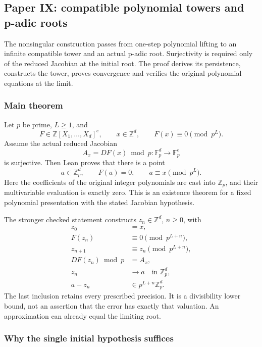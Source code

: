 \hypertarget{cont3:paper-ix-compatible-polynomial-towers-and-p-adic-roots}{%
\subsection{Paper IX: compatible polynomial towers and p-adic
roots}\label{cont3:paper-ix-compatible-polynomial-towers-and-p-adic-roots}}

The nonsingular construction passes from one-step
polynomial lifting to an infinite compatible tower and an actual p-adic
root. Surjectivity is required only of the reduced Jacobian at the
initial root. The proof derives its persistence, constructs the tower,
proves convergence and verifies the original polynomial equations at the
limit.

\hypertarget{cont3:main-theorem}{%
\subsubsection{Main theorem}\label{cont3:main-theorem}}

Let \(p\) be prime, \(L\ge1\), and \[
F\in\mathbb Z[X_1,\ldots,X_d]^e,\qquad x\in\mathbb Z^d,
\qquad F(x)\equiv0\pmod{p^L}.
\] Assume the actual reduced Jacobian \[
A_x=DF(x)\bmod p:\mathbb F_p^d\longrightarrow\mathbb F_p^e
\] is surjective. Then Lean proves that there is a point \[
\boxed{a\in\mathbb Z_p^d,\qquad F(a)=0,\qquad
 a\equiv x\pmod{p^L}.}
\] Here the coefficients of the original integer polynomials are cast
into \(\mathbb Z_p\), and their multivariable evaluation is exactly
zero. This is an existence theorem for a fixed polynomial presentation
with the stated Jacobian hypothesis.

The stronger checked statement constructs \(z_n\in\mathbb Z^d\),
\(n\ge0\), with \[
\begin{aligned}
z_0&=x,\\
F(z_n)&\equiv0\pmod{p^{L+n}},\\
z_{n+1}&\equiv z_n\pmod{p^{L+n}},\\
DF(z_n)\bmod p&=A_x,\\
z_n&\longrightarrow a\quad\text{in }\mathbb Z_p^d,\\
a-z_n&\in p^{L+n}\mathbb Z_p^d.
\end{aligned}
\] The last inclusion retains every prescribed precision. It is a
divisibility lower bound, not an assertion that the error has exactly
that valuation. An approximation can already equal the limiting root.

\hypertarget{cont3:why-the-single-initial-hypothesis-suffices}{%
\subsubsection{Why the single initial hypothesis
suffices}\label{cont3:why-the-single-initial-hypothesis-suffices}}

